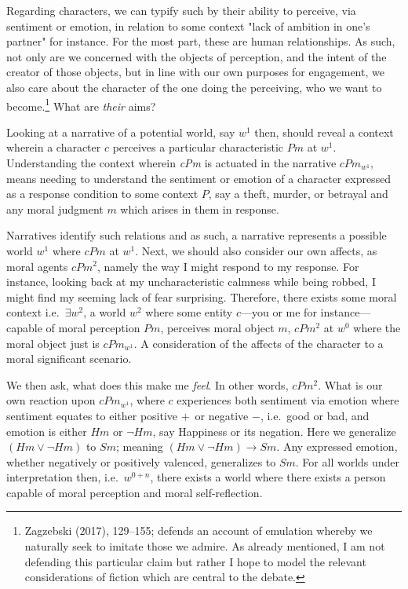 \documentclass[12pt]{book}
\theoremstyle{definition}
\theoremstyle{remark}
\begin{document}
Regarding characters, we can typify such by their ability to perceive, via sentiment or emotion, in relation to some context "lack of ambition in one's partner" for instance. For the most part, these are human relationships. As such, not only are we concerned with the objects of perception, and the intent of the creator of those objects, but in line with our own purposes for engagement, we also care about the character of the one doing the perceiving, who we want to become.\footnote{Zagzebski (2017), 129--155; defends an account of emulation whereby we naturally seek to imitate those we admire. As already mentioned, I am not defending this particular claim but rather I hope to model the relevant considerations of fiction which are central to the debate.} What are \emph{their} aims?

Looking at a narrative of a potential world, say \emph{\(w^1\)} then, should reveal a context wherein a character \(c\) perceives a particular characteristic \(Pm\) at \emph{\(w^1\)}. Understanding the context wherein \emph{cPm} is actuated in the narrative \(cPm_{w^{1}}\), means needing to understand the sentiment or emotion of a character expressed as a response condition to some context \(P\), say a theft, murder, or betrayal and any moral judgment \(m\) which arises in them in response.

Narratives identify such relations and as such, a narrative represents a possible world \(w^1\) where \(cPm\) at \(w^1\). Next, we should also consider our own affects, as moral agents \(cPm^{2}\), namely the way I might respond to my response. For instance, looking back at my uncharacteristic calmness while being robbed, I might find my seeming lack of fear surprising. Therefore, there exists some moral context i.e.~\(\exists w^2\), a world \(w^2\) where some entity \(c\)---you or me for instance---capable of moral perception \(Pm\), perceives moral object \(m\), \(cPm^{2}\) at \(w^0\) where the moral object just is \(cPm_{w^{1}}\). A consideration of the affects of the character to a moral significant scenario.

We then ask, what does this make me \emph{feel}. In other words, \(cPm^{2}\). What is our own reaction upon \(cPm_{w^1}\), where \(c\) experiences both sentiment via emotion where sentiment equates to either positive \(+\)~or negative \(-\), i.e.~good or bad, and emotion is either \(Hm\) or \(\neg Hm\), say Happiness or its negation. Here we generalize \(( Hm  \lor \neg  Hm)\) to \(Sm\); meaning \(( Hm \lor \neg Hm ) \rightarrow Sm\). Any expressed emotion, whether negatively or positively valenced, generalizes to \(Sm\). For all worlds under interpretation then, i.e.~\(w^{0+n}\), there exists a world where there exists a person capable of moral perception and moral self-reflection.
\end{document}
